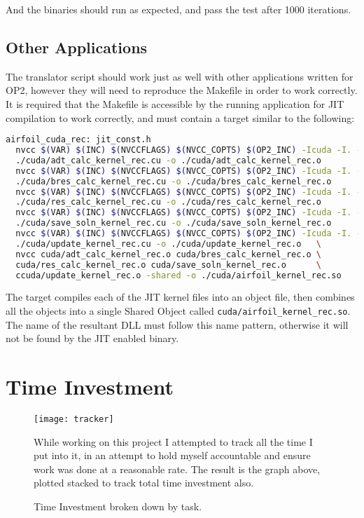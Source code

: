 \noindent And the binaries should run as expected, and pass the test after 1000 iterations.

\subsection{Other Applications}
The translator script should work just as well with other applications written for OP2, however they will need to reproduce the Makefile in order to work correctly. It is required that the Makefile is accessible by the running application for JIT compilation to work correctly, and must contain a target similar to the following:

\begin{lstlisting}[frame=none, backgroundcolor=\color{white}, language=bash]
airfoil_cuda_rec: jit_const.h
  nvcc $(VAR) $(INC) $(NVCCFLAGS) $(NVCC_COPTS) $(OP2_INC) -Icuda -I. -c \
  ./cuda/adt_calc_kernel_rec.cu -o ./cuda/adt_calc_kernel_rec.o
  nvcc $(VAR) $(INC) $(NVCCFLAGS) $(NVCC_COPTS) $(OP2_INC) -Icuda -I. -c \
  ./cuda/bres_calc_kernel_rec.cu -o ./cuda/bres_calc_kernel_rec.o
  nvcc $(VAR) $(INC) $(NVCCFLAGS) $(NVCC_COPTS) $(OP2_INC) -Icuda -I. -c \
  ./cuda/res_calc_kernel_rec.cu -o ./cuda/res_calc_kernel_rec.o
  nvcc $(VAR) $(INC) $(NVCCFLAGS) $(NVCC_COPTS) $(OP2_INC) -Icuda -I. -c \
  ./cuda/save_soln_kernel_rec.cu -o ./cuda/save_soln_kernel_rec.o
  nvcc $(VAR) $(INC) $(NVCCFLAGS) $(NVCC_COPTS) $(OP2_INC) -Icuda -I. -c \
  ./cuda/update_kernel_rec.cu -o ./cuda/update_kernel_rec.o   \
  nvcc cuda/adt_calc_kernel_rec.o cuda/bres_calc_kernel_rec.o \
  cuda/res_calc_kernel_rec.o cuda/save_soln_kernel_rec.o      \
  ccuda/update_kernel_rec.o -shared -o ./cuda/airfoil_kernel_rec.so
\end{lstlisting}

\noindent The target compiles each of the JIT kernel files into an object file, then combines all the objects into a single Shared Object called \verb|cuda/airfoil_kernel_rec.so|. The name of the resultant DLL must follow this name pattern, otherwise it will not be found by the JIT enabled binary.

\clearpage
\section{Time Investment}
\label{app:tracker}
\begin{figure}[h]
\texttt{[image: tracker]}
\caption{\label{fig:tracker}Time Investment broken down by task.}

\vspace{1em}
While working on this project I attempted to track all the time I put into it, in an attempt to hold myself accountable and ensure work was done at a reasonable rate. The result is the graph above, plotted stacked to track total time investment also.
\end{figure}
